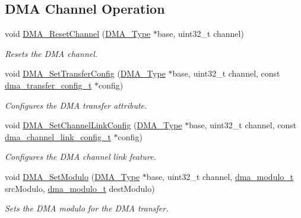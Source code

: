 \subsection*{D\+MA Channel Operation}
\begin{DoxyCompactItemize}
\item 
void \mbox{\hyperlink{group__dma_ga17a6d7e5f9d3f12777941447ed7659f5}{D\+M\+A\+\_\+\+Reset\+Channel}} (\mbox{\hyperlink{struct_d_m_a___type}{D\+M\+A\+\_\+\+Type}} $\ast$base, uint32\+\_\+t channel)
\begin{DoxyCompactList}\small\item\em Resets the D\+MA channel. \end{DoxyCompactList}\item 
void \mbox{\hyperlink{group__dma_ga3cc33ab27c5c0dc71cff81795522629a}{D\+M\+A\+\_\+\+Set\+Transfer\+Config}} (\mbox{\hyperlink{struct_d_m_a___type}{D\+M\+A\+\_\+\+Type}} $\ast$base, uint32\+\_\+t channel, const \mbox{\hyperlink{group__dma_gadb6e4baf9efcf14a889babc34d6f0d80}{dma\+\_\+transfer\+\_\+config\+\_\+t}} $\ast$config)
\begin{DoxyCompactList}\small\item\em Configures the D\+MA transfer attribute. \end{DoxyCompactList}\item 
void \mbox{\hyperlink{group__dma_ga9a0aba2d09ef438d7faf8d4c4d458c11}{D\+M\+A\+\_\+\+Set\+Channel\+Link\+Config}} (\mbox{\hyperlink{struct_d_m_a___type}{D\+M\+A\+\_\+\+Type}} $\ast$base, uint32\+\_\+t channel, const \mbox{\hyperlink{group__dma_ga5076c6be0136d122ef46374dc1eadb0d}{dma\+\_\+channel\+\_\+link\+\_\+config\+\_\+t}} $\ast$config)
\begin{DoxyCompactList}\small\item\em Configures the D\+MA channel link feature. \end{DoxyCompactList}\item 
void \mbox{\hyperlink{group__dma_ga813a9ddafd11393d8848a946622dd80d}{D\+M\+A\+\_\+\+Set\+Modulo}} (\mbox{\hyperlink{struct_d_m_a___type}{D\+M\+A\+\_\+\+Type}} $\ast$base, uint32\+\_\+t channel, \mbox{\hyperlink{group__dma_gabebfc9ea7534e8f71a7ee1b5c13bf2f5}{dma\+\_\+modulo\+\_\+t}} src\+Modulo, \mbox{\hyperlink{group__dma_gabebfc9ea7534e8f71a7ee1b5c13bf2f5}{dma\+\_\+modulo\+\_\+t}} dest\+Modulo)
\begin{DoxyCompactList}\small\item\em Sets the D\+MA modulo for the D\+MA transfer. \end{DoxyCompactList}\end{DoxyCompactItemize}
